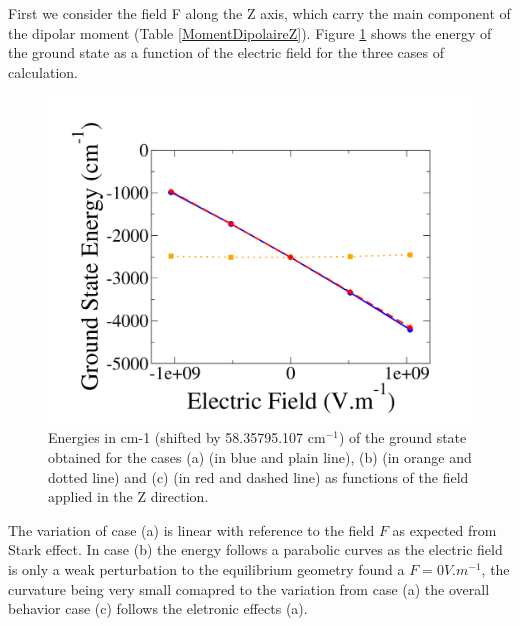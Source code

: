\documentclass[10pt]{report}
\numberwithin{equation}{section}
\begin{document}
First we consider the field F along the Z axis, which carry the main component of the dipolar moment (Table \ref{MomentDipolaireZ}).
Figure \ref{GSE_Z} shows the energy of the ground state as a function of the electric field for the three cases of calculation.

\begin{figure}[!h]
    \centering
    \includegraphics[width=\textwidth]{Images/E_Z_grand.png}
    \caption{Energies in cm-1 (shifted by 58.35795.107 cm$^{-1}$) of the ground state obtained for the cases (a) (in blue and plain line), (b)
    (in orange and dotted line) and (c) (in red and dashed line) as functions of the field applied in the Z direction.}
    \label{GSE_Z}
\end{figure}

The variation of case (a) is linear with reference to the field $F$ as expected from Stark effect.
In case (b) the energy follows a parabolic curves as the electric field is only a weak perturbation to the equilibrium geometry found a $F=0V.m^{-1}$, the curvature being very small comapred to the variation from case (a) the overall behavior case (c) follows the eletronic effects (a).



\end{document}
